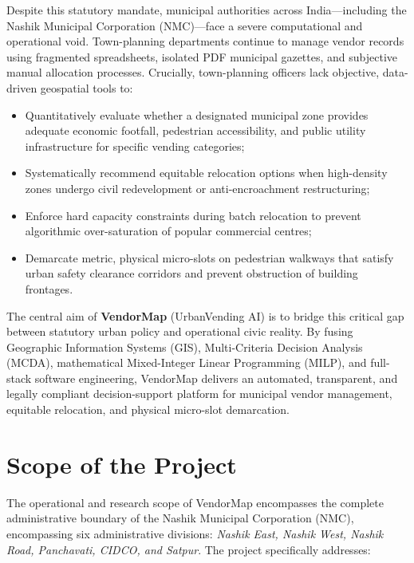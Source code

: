 Despite this statutory mandate, municipal authorities across India---including the Nashik Municipal Corporation (NMC)---face a severe computational and operational void. Town-planning departments continue to manage vendor records using fragmented spreadsheets, isolated PDF municipal gazettes, and subjective manual allocation processes. Crucially, town-planning officers lack objective, data-driven geospatial tools to:
\begin{itemize}
    \item Quantitatively evaluate whether a designated municipal zone provides adequate economic footfall, pedestrian accessibility, and public utility infrastructure for specific vending categories;
    \item Systematically recommend equitable relocation options when high-density zones undergo civil redevelopment or anti-encroachment restructuring;
    \item Enforce hard capacity constraints during batch relocation to prevent algorithmic over-saturation of popular commercial centres;
    \item Demarcate metric, physical micro-slots on pedestrian walkways that satisfy urban safety clearance corridors and prevent obstruction of building frontages.
\end{itemize}

The central aim of \textbf{VendorMap} (UrbanVending AI) is to bridge this critical gap between statutory urban policy and operational civic reality. By fusing Geographic Information Systems (GIS), Multi-Criteria Decision Analysis (MCDA), mathematical Mixed-Integer Linear Programming (MILP), and full-stack software engineering, VendorMap delivers an automated, transparent, and legally compliant decision-support platform for municipal vendor management, equitable relocation, and physical micro-slot demarcation.

\section{Scope of the Project}
\label{sec:scope}

The operational and research scope of VendorMap encompasses the complete administrative boundary of the Nashik Municipal Corporation (NMC), encompassing six administrative divisions: \textit{Nashik East, Nashik West, Nashik Road, Panchavati, CIDCO, and Satpur}. The project specifically addresses:

